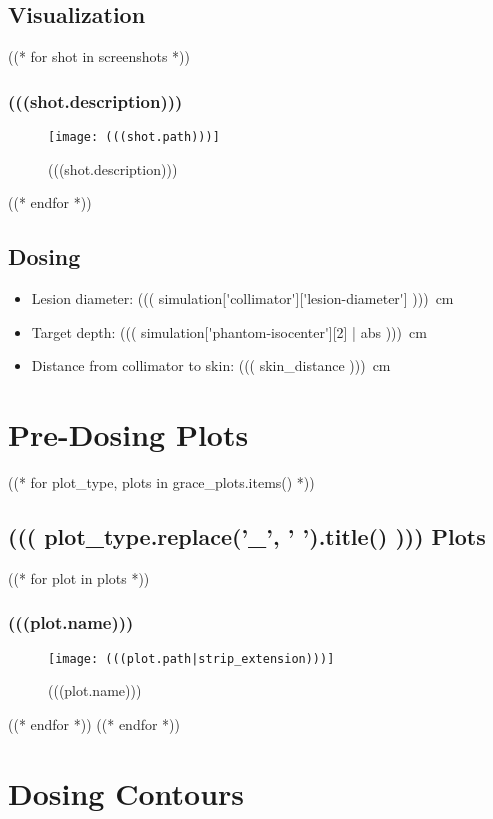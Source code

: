 \documentclass[12pt]{article}
\begin{document}
\subsection{Visualization}
((* for shot in screenshots *))
	\subsubsection{(((shot.description)))}
	\begin{figure}[H]
	\centering
	\texttt{[image: (((shot.path)))]}
	\caption{(((shot.description)))}
	\end{figure}
((* endfor *))

\subsection{Dosing}
\begin{itemize}
	\item Lesion diameter: \SI{((( simulation['collimator']['lesion-diameter']  )))}{\cm}
	\item Target depth: \SI{((( simulation['phantom-isocenter'][2] | abs )))}{\cm}
	\item Distance from collimator to skin: \SI{((( skin_distance )))}{\cm}
\end{itemize}

\section{Pre-Dosing Plots}
((* for plot_type, plots in grace_plots.items() *))
	\subsection{((( plot_type.replace('_', ' ').title() ))) Plots}
		((* for plot in plots *))
			\subsubsection{(((plot.name)))}
			\begin{figure}[H]
			\centering
			\texttt{[image: (((plot.path|strip\_extension)))]}
			\caption{(((plot.name)))}
			\label{fig:(((plot.slug)))}
			\end{figure}
		((* endfor *))
((* endfor *))

\section{Dosing Contours}
\end{document}
